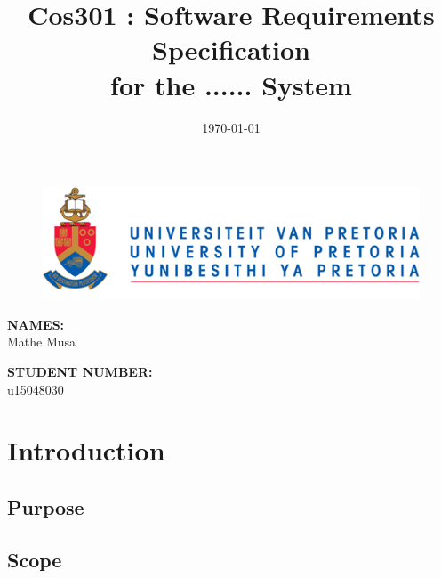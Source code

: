 \documentclass[english]{article}
\title{Cos301 : Software Requirements Specification\\
	for the ...... System\\
	}
\date{\today}
\begin{document}
	\maketitle
	\begin{figure}[!t]
		\includegraphics{up_logo.png}
	\end{figure}
	\begin{minipage}{0.4\textwidth}
		\begin{flushleft} \large
			\textbf{NAMES:}\\[0.4cm]
			Mathe {Musa}
		\end{flushleft}
	\end{minipage}
	\begin{minipage}{0.4\textwidth}
		\begin{flushright} \large
			\textbf{STUDENT NUMBER:} \\[0.4cm]
			u15048030
		\end{flushright}
	\end{minipage}


	
	\newpage

	\tableofcontents
	\newpage

	

	\section{Introduction}
			

		\subsection{Purpose}
			

		\subsection{Scope}
\end{document}
